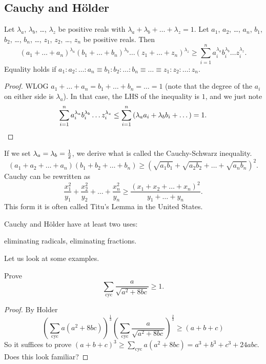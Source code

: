 \documentclass[11pt]{scrartcl}
\begin{document}
\subsection{Cauchy and H\"older}
\begin{theorem}
  Let $\lambda_a$, $\lambda_b$, \dots,
  $\lambda_z$ be positive reals with $\lambda_a + \lambda_b + \dots + \lambda_z = 1$.
  Let $a_1$, $a_2$, \dots, $a_n$, $b_1$, $b_2$, \dots, $b_n$, \dots, $z_1$, $z_2$, \dots,
  $z_n$ be positive reals.
  Then
  \[ \left( a_1+\dots+a_n \right)^{\lambda_a}
    \left( b_1+\dots+b_n \right)^{\lambda_b}
    \dots
    \left( z_1+\dots+z_n \right)^{\lambda_z}
    \ge \sum_{i=1}^n a_i^{\lambda_a} b_i^{\lambda_b} \dots z_i^{\lambda_z}. \]
  Equality holds if $a_1 : a_2 : \dots : a_n \equiv b_1 : b_2 : \dots : b_n \equiv \dots \equiv z_1 : z_2 : \dots
  : z_n$.
\end{theorem}
\begin{proof}
  WLOG $a_1+\dots+a_n = b_1+\dots+b_n = \dots = 1$
  (note that the degree of the $a_i$ on either side is $\lambda_a$).
  In that case, the LHS of the inequality is $1$, and we just note
  \[ \sum_{i=1}^n a_i^{\lambda_a} b_i^{\lambda_b} \dots z_i^{\lambda_z}
    \le \sum_{i=1}^n \left( \lambda_a a_i + \lambda_b b_i + \dots \right)
    = 1. \qedhere \]
\end{proof}
If we set $\lambda_a = \lambda_b = \frac{1}{2}$, we derive what is called the Cauchy-Schwarz inequality.
\[ \left( a_1+a_2+\dots+a_n \right)\left( b_1+b_2+\dots+b_n \right)
  \ge \left( \sqrt{a_1 b_1} + \sqrt{a_2 b_2} + \dots + \sqrt{a_n b_n} \right)^2. \]
Cauchy can be rewritten as
\[ \frac{x_1^2}{y_1} + \frac{x_2^2}{y_2} + \dots + \frac{x_n^2}{y_n}
  \ge \frac{\left( x_1+x_2+\dots+x_n \right)^2}{y_1+\dots+y_n}. \]
This form it is often called Titu's Lemma in the United States.

Cauchy and H\"older have at least two uses:
\begin{enumerate}
  \ii eliminating radicals,
  \ii eliminating fractions.
\end{enumerate}

Let us look at some examples.
\begin{example}
  [IMO 2001] Prove \[ \sum_{\text{cyc}} \frac{a}{\sqrt{a^2+8bc}} \ge 1. \]
\end{example}
\begin{proof}
  By Holder
  \[
    \left( \sum_{\text{cyc}} a(a^2+8bc) \right)^{\frac13}
    \left( \sum_{\text{cyc}} \frac{a}{\sqrt{a^2+8bc}} \right)^{\frac 23}
    \ge \left( a+b+c \right)
  \]
  So it suffices to prove $(a+b+c)^3 \ge \sum_{\text{cyc}} a(a^2+8bc) = a^3+b^3+c^3+24abc$.
  Does this look familiar?
\end{proof}
\end{document}
